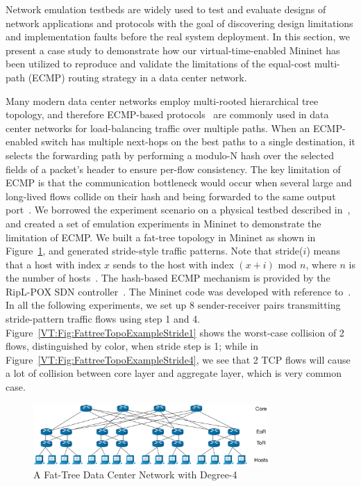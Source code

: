 \label{VT:Sec:CaseStudy}

Network emulation testbeds are widely used to test and evaluate designs of network applications and
protocols with the goal of discovering design limitations and implementation faults before the real system deployment.
In this section, we present a case study to demonstrate how our virtual-time-enabled Mininet has been utilized to
reproduce and validate the limitations of the equal-cost multi-path (ECMP) routing strategy in a data center network.

Many modern data center networks employ multi-rooted hierarchical tree topology,
and therefore ECMP-based protocols~\cite{ECMP} are commonly used in data center networks for load-balancing traffic over multiple paths.
When an ECMP-enabled switch has multiple next-hops on the best paths to a single destination,
it selects the forwarding path by performing a modulo-N hash over the selected fields of a packet's header to ensure per-flow consistency.
The key limitation of ECMP is that the communication bottleneck would occur when several large and
long-lived flows collide on their hash and being forwarded to the same output port~\cite{Hedera}. 
We borrowed the experiment scenario on a physical testbed described in~\cite{Hedera},
and created a set of emulation experiments in Mininet to demonstrate the limitation of ECMP.
We built a fat-tree topology in Mininet as shown in Figure~\ref{VT:Fig:FattreeTopoExample},
and generated stride-style traffic patterns. Note that stride($i$) means that a host with index $x$ sends to the host with index $(x + i)$ mod $n$,
where $n$ is the number of hosts~\cite{Hedera}. 
The hash-based ECMP mechanism is provided by the RipL-POX SDN controller~\cite{RipLPox}.
The Mininet code was developed with reference to~\cite{ReproNetReserch}.
In all the following experiments, we set up 8 sender-receiver pairs transmitting stride-pattern traffic flows using step 1 and 4.
Figure~\ref{VT:Fig:FattreeTopoExampleStride1} shows the worst-case collision of 2 flows, distinguished by color, when stride step is 1;
while in Figure~\ref{VT:Fig:FattreeTopoExampleStride4}, we see that 2 TCP flows will cause a lot of collision between core layer and aggregate layer,
which is very common case.

\begin{figure}[ht]
    \centering
    \includegraphics[width=0.8\textwidth]{VirtualTime/figures/TopoFatTreeExample.eps}
    \caption{A Fat-Tree Data Center Network with Degree-4}
    \label{VT:Fig:FattreeTopoExample}
\end{figure}

